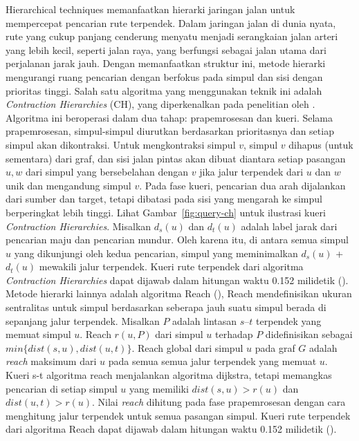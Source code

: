 Hierarchical techniques memanfaatkan hierarki jaringan jalan untuk mempercepat pencarian rute terpendek. Dalam jaringan jalan di dunia nyata, rute yang cukup panjang cenderung menyatu menjadi serangkaian jalan arteri yang lebih kecil, seperti jalan raya, yang berfungsi sebagai jalan utama dari perjalanan jarak jauh. Dengan memanfaatkan struktur ini, metode hierarki mengurangi ruang pencarian dengan berfokus pada simpul dan sisi dengan prioritas tinggi. Salah satu algoritma yang menggunakan teknik ini adalah \textit{Contraction Hierarchies} (CH), yang diperkenalkan pada penelitian oleh \cite{Geisberger2012}. Algoritma ini beroperasi dalam dua tahap: prapemrosesan dan kueri. Selama prapemrosesan, simpul-simpul diurutkan berdasarkan prioritasnya dan setiap simpul akan dikontraksi. Untuk mengkontraksi simpul $v$, simpul $v$ dihapus (untuk sementara) dari graf, dan sisi jalan pintas akan dibuat diantara setiap pasangan $u, w$ dari simpul yang bersebelahan dengan $v$ jika jalur terpendek dari $u$ dan $w$ unik dan mengandung simpul $v$. Pada fase kueri, pencarian dua arah dijalankan dari sumber dan target, tetapi dibatasi pada sisi yang mengarah ke simpul berperingkat lebih tinggi. Lihat Gambar~\ref{fig:query-ch} untuk ilustrasi kueri \textit{Contraction Hierarchies}. Misalkan $d_s(u)$ dan $d_t(u)$ adalah label jarak dari pencarian maju dan pencarian mundur. Oleh karena itu, di antara semua simpul $u$ yang dikunjungi oleh kedua pencarian, simpul yang meminimalkan $d_s(u)$ +  $d_t(u)$ mewakili jalur terpendek. Kueri rute terpendek dari algoritma \textit{Contraction Hierarchies} dapat dijawab dalam hitungan waktu 0.152 milidetik (\cite{Geisberger2012}). Metode hierarki lainnya adalah algoritma Reach (\cite{Gutman2004}), Reach mendefinisikan ukuran sentralitas untuk simpul berdasarkan seberapa jauh suatu simpul berada di sepanjang jalur terpendek. Misalkan $P$ adalah lintasan $s–t$ terpendek yang memuat simpul $u$. Reach $r(u,P)$ dari simpul $u$ terhadap $P$ didefinisikan sebagai $min\{dist(s,u), dist(u,t)\}$. Reach global dari simpul $u$ pada graf $G$ adalah \textit{reach} maksimum dari $u$ pada semua semua jalur terpendek yang memuat $u$. Kueri s-t algoritma reach menjalankan algoritma dijkstra, tetapi memangkas pencarian di setiap simpul $u$ yang memiliki $dist(s,u)>r(u)$ dan $dist(u,t)>r(u)$. Nilai \textit{reach} dihitung pada fase prapemrosesan dengan cara menghitung jalur terpendek untuk semua pasangan simpul. Kueri rute terpendek dari algoritma Reach dapat dijawab dalam hitungan waktu 0.152 milidetik (\cite{Bast2015}).


